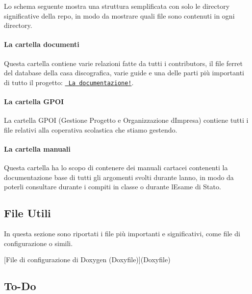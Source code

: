 Lo schema seguente mostra una struttura semplificata con solo le directory significative della repo, in modo da mostrare quali file sono contenuti in ogni directory. 
\begin{DoxyCode}{0}
\end{DoxyCode}
 \paragraph*{La cartella documenti}

Questa cartella contiene varie relazioni fatte da tutti i contributors, il file ferret del database della casa discografica, varie guide e una delle parti più importanti di tutto il progetto\+: \href{\#documentazione}{\texttt{ La documentazione!}}. \paragraph*{La cartella G\+P\+OI}

La cartella G\+P\+OI (Gestione Progetto e Organizzazione d\textquotesingle{}Impresa) contiene tutti i file relativi alla coperativa scolastica che stiamo gestendo. \paragraph*{La cartella manuali}

Questa cartella ha lo scopo di contenere dei manuali cartacei contenenti la documentazione base di tutti gli argomenti svolti durante l\textquotesingle{}anno, in modo da poterli consultare durante i compiti in classe o durante l\textquotesingle{}Esame di Stato. \subsection*{File Utili}

In questa sezione sono riportati i file più importanti e significativi, come file di configurazione o simili.
\begin{DoxyItemize}
\item \mbox{[}File di configurazione di Doxygen (Doxyfile)\mbox{]}(Doxyfile) \subsection*{To-\/\+Do}
\end{DoxyItemize}

